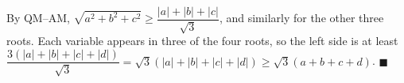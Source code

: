 By QM--AM, $\sqrt{a^2+b^2+c^2}\ge\dfrac{|a|+|b|+|c|}{\sqrt3}$, and similarly for the other three roots. Each variable appears in three of the four roots, so the left side is at least $\dfrac{3(|a|+|b|+|c|+|d|)}{\sqrt3}=\sqrt3(|a|+|b|+|c|+|d|)\ge\sqrt3(a+b+c+d)$. $\blacksquare$
